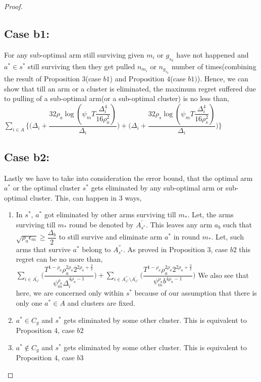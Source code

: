 \begin{proof}
\subsection{Case b1:} 
For any sub-optimal arm still surviving given $m_{i}$ or $g_{s_{k}}$ have not happened and $a^{*}\in s^{*}$ still surviving then they get pulled $n_{m_{i}}$ or $n_{g_{s_{k}}}$ number of times(combining the result of Proposition $3$(case $b1$) and Proposition $4$(case $b1)$). Hence, we can show that till an arm or a cluster is eliminated, the maximum regret suffered due to pulling of a sub-optimal arm(or a sub-optimal cluster) is no less than,
\newline
$\sum_{i\in A}\bigg\lbrace\bigg(\Delta_{i}+\dfrac{32\rho_{a}\log{(\psi_{m}T\dfrac{\Delta_{i}^{4}}{16\rho_{a}^{2}})}}{\Delta_{i}}\bigg) + \bigg(\Delta_{i}+\dfrac{32\rho_{s}\log{(\psi_{m}T\dfrac{\Delta_{i}^{4}}{16\rho_{s}^{2}})}}{\Delta_{i}}\bigg)\bigg\rbrace $
\newline
\subsection{Case b2:} 
Lastly we have to take into consideration the error bound, that the optimal arm $a^{*}$ or the optimal cluster $s^{*}$ gets eliminated by any sub-optimal arm or sub-optimal cluster. This, can happen in $3$ ways,
\begin{enumerate}
\item In $s^{*}$, $a^{*}$ got eliminated by other arms surviving till $m_{*}$. Let, the arms surviving till $m_{*}$ round be denoted by $A^{'}_{s^{*}}$. This leaves any arm $a_{b}$ such that $\sqrt{\rho_{a}\epsilon_{m}}\geq\dfrac{\Delta_{b}}{2}$ to still survive and eliminate arm $a^{*}$ in round $m_{*}$. Let, such arms that survive $a^{*}$ belong to $A^{''}_{s^{*}}$. As proved in Proposition $3$, case $b2$ this regret can be no more than,
\newline
$\sum_{i\in A^{'}_{s^{*}}}\bigg(\dfrac{T^{1-\rho_{a}}\rho_{a}^{2\rho_{a}}2^{2\rho_{a}+\frac{3}{2}}}{\psi_{m}^{\rho_{a}}\Delta_{i}^{4\rho_{a} -1}} \bigg)+\sum_{i\in A^{''}_{s^{*}}\setminus A^{'}_{s^{*}}}\bigg(\dfrac{T^{1-\rho_{a}}\rho_{a}^{2\rho_{a}}2^{2\rho_{a}+\frac{3}{2}}}{\psi_{m}^{\rho_{a}}b^{4\rho_{a} -1}} \bigg)$
\newline
We also see that here, we are concerned only within $s^{*}$ because of our assumption that there is only one $a^{*}\in A$ and clusters are fixed.
\item $a^{*}\in C_{g}$ and $s^{*}$ gets eliminated by some other cluster. This is equivalent to Proposition $4$, case $b2$
\item $a^{*}\notin C_{g}$ and $s^{*}$ gets eliminated by some other cluster. This is equivalent to Proposition $4$, case $b3$
\end{enumerate} 



\end{proof}
